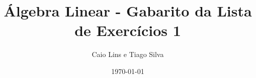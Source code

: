 \documentclass[leqno]{article}
\numberwithin{equation}{section}
\begin{document}
\newtheorem{teo}{Teorema}[section] \newtheorem*{teo*}{Teorema}
\newtheorem{prop}[teo]{Proposição} \newtheorem*{prop*}{Proposição}
\newtheorem{lema}[teo]{Lemma} \newtheorem*{lema*}{Lema}
\newtheorem{cor}[teo]{Corolário} \newtheorem*{cor*}{Corolário}

\theoremstyle{definition}
\newtheorem{defi}[teo]{Definição} \newtheorem*{defi*}{Definição}
\newtheorem{exem}[teo]{Exemplo} \newtheorem*{exem*}{Exemplo}
\newtheorem{obs}[teo]{Observação} \newtheorem*{obs*}{Observação}
\newtheorem*{hipo}{Hipóteses}
\newtheorem*{nota}{Notação}

\newcommand{\ds}{\displaystyle} \newcommand{\nl}{\newline}
\newcommand{\eps}{\varepsilon} \newcommand{\ssty}{\scriptstyle}
\newcommand{\bE}{\mathbb{E}}
\newcommand{\cB}{\mathcal{B}}
\newcommand{\cF}{\mathcal{F}}
\newcommand{\cA}{\mathcal{A}}
\newcommand{\cM}{\mathcal{M}}
\newcommand{\cD}{\mathcal{D}}
\newcommand{\cN}{\mathcal{N}}
\newcommand{\cL}{\mathcal{L}}
\newcommand{\cLN}{\mathcal{LN}}
\newcommand{\bP}{\mathbb{P}}
\newcommand{\bQ}{\mathbb{Q}}
\newcommand{\bN}{\mathbb{N}}
\newcommand{\bR}{\mathbb{R}}
\newcommand{\bZ}{\mathbb{Z}}

\newcommand{\bfw}{\mathbf{w}}
\newcommand{\bfv}{\mathbf{v}}
\newcommand{\bfu}{\mathbf{u}}
\newcommand{\bfb}{\mathbf{b}}
\newcommand{\bfx}{\mathbf{x}}
\newcommand{\bfa}{\mathbf{a}}

\newcommand{\bvecc}[2]{%
  \begin{bmatrix} #1 \\ #2  \end{bmatrix}
}
\newcommand{\bveccc}[3]{%
  \begin{bmatrix} #1 \\ #2 \\ #3  \end{bmatrix}
}


\title{Álgebra Linear - Gabarito da Lista de Exercícios 1}

\author{Caio Lins e Tiago Silva}

\date{\today}

\maketitle
\end{document}
